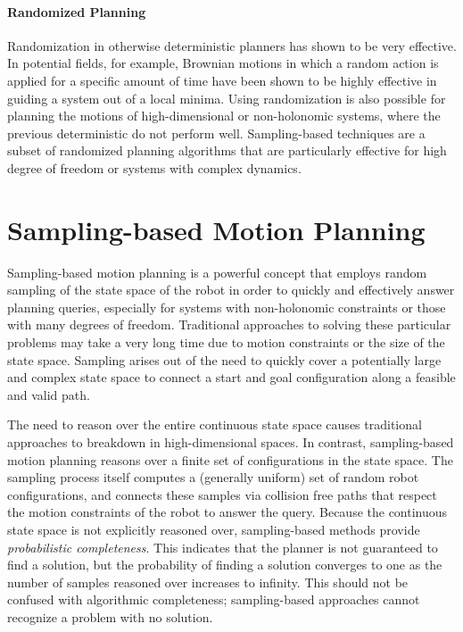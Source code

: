 \paragraph {Randomized Planning}
Randomization in otherwise deterministic planners has shown to be very
effective.  In potential fields, for example, Brownian motions in which a random
action is applied for a specific amount of time have been shown to be highly
effective in guiding a system out of a local minima.  Using randomization is
also possible for planning the motions of high-dimensional or non-holonomic
systems, where the previous deterministic do not perform well.  Sampling-based
techniques are a subset of randomized planning algorithms that are particularly
effective for high degree of freedom or systems with complex dynamics.

\section {Sampling-based Motion Planning}
\label {sect:samplingbasedplanning}
Sampling-based motion planning is a powerful concept that employs random
sampling of the state space of the robot in order to quickly and
effectively answer planning queries, especially for systems with non-holonomic
constraints or those with many degrees of freedom.  Traditional approaches to
solving these particular problems may take a very long time due to motion
constraints or the size of the state space.  Sampling arises out of the need to
quickly cover a potentially large and complex state space to connect a start
and goal configuration along a feasible and valid path.

The need to reason over the entire continuous state space causes traditional
approaches to breakdown in high-dimensional spaces.  In contrast, sampling-based
motion planning reasons over a finite set of configurations in the state space.
The sampling process itself computes a (generally uniform) set of random robot
configurations, and connects these samples via collision free paths that respect
the motion constraints of the robot to answer the query.  Because the continuous
state space is not explicitly reasoned over, sampling-based methods provide {\it
probabilistic completeness}.  This indicates that the planner is not guaranteed
to find a solution, but the probability of finding a solution converges to one
as the number of samples reasoned over increases to infinity.  This should not
be confused with algorithmic completeness; sampling-based approaches cannot
recognize a problem with no solution.

